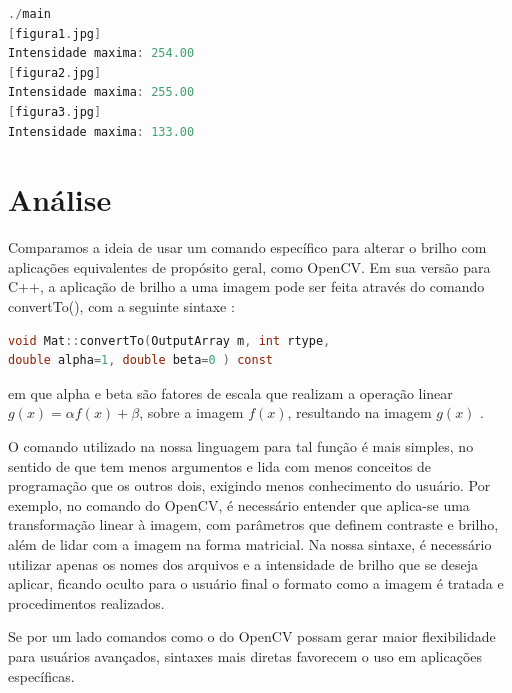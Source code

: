\documentclass[a4paper, 10pt, conference]{ieeeconf}
\begin{document}
\begin{lstlisting}[language=C, basicstyle=\footnotesize, frame=single]
./main
[figura1.jpg]
Intensidade maxima: 254.00
[figura2.jpg]
Intensidade maxima: 255.00
[figura3.jpg]
Intensidade maxima: 133.00
\end{lstlisting}

\section{Análise}


Comparamos a ideia de usar um comando específico para alterar o brilho com aplicações equivalentes de propósito geral, como OpenCV. Em sua versão para C++, a aplicação de brilho a uma imagem pode ser feita através do comando convertTo(), com a seguinte sintaxe \cite{opencv2}:
\begin{lstlisting}[language=C, basicstyle=\footnotesize]
void Mat::convertTo(OutputArray m, int rtype, 
double alpha=1, double beta=0 ) const
\end{lstlisting}
em que alpha e beta são fatores de escala que realizam a operação linear $g(x)=\alpha f(x) + \beta$, sobre a imagem $f(x)$, resultando na imagem $g(x)$ \cite{opencv}.

O comando utilizado na nossa linguagem para tal função é mais simples, no sentido de que tem menos argumentos e lida com menos conceitos de programação que os outros dois, exigindo menos conhecimento do usuário. Por exemplo, no comando do OpenCV, é necessário entender que aplica-se uma transformação linear à imagem, com parâmetros que definem contraste e brilho, além de lidar com a imagem na forma matricial. Na nossa sintaxe, é necessário utilizar apenas os nomes dos arquivos e a intensidade de brilho que se deseja aplicar, ficando oculto para o usuário final o formato como a imagem é tratada e procedimentos realizados.

Se por um lado comandos como o do OpenCV possam gerar maior flexibilidade para usuários avançados, sintaxes mais diretas favorecem o uso em aplicações específicas.
\end{document}

